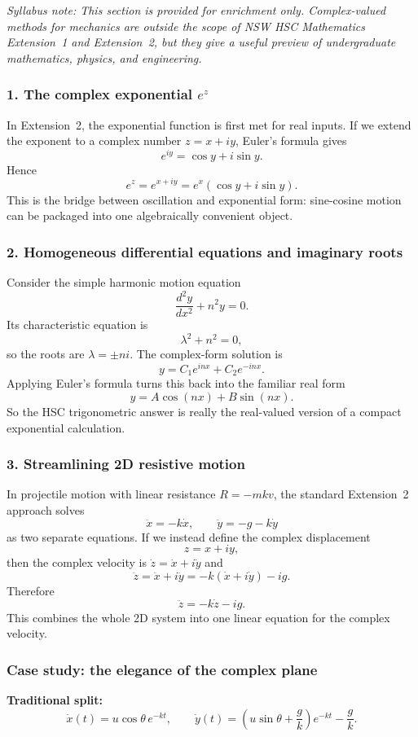 \textit{Syllabus note: This section is provided for enrichment only. Complex-valued methods for mechanics are outside the scope of NSW HSC Mathematics Extension~1 and Extension~2, but they give a useful preview of undergraduate mathematics, physics, and engineering.}

\subsubsection*{1. The complex exponential $e^z$}
In Extension~2, the exponential function is first met for real inputs. If we extend the exponent to a complex number $z=x+iy$, Euler's formula gives
\[
e^{iy}=\cos y+i\sin y.
\]
Hence
\[
e^z=e^{x+iy}=e^x(\cos y+i\sin y).
\]
This is the bridge between oscillation and exponential form: sine-cosine motion can be packaged into one algebraically convenient object.

\subsubsection*{2. Homogeneous differential equations and imaginary roots}
Consider the simple harmonic motion equation
\[
\frac{d^2y}{dx^2}+n^2y=0.
\]
Its characteristic equation is
\[
\lambda^2+n^2=0,
\]
so the roots are $\lambda=\pm ni$. The complex-form solution is
\[
y=C_1e^{inx}+C_2e^{-inx}.
\]
Applying Euler's formula turns this back into the familiar real form
\[
y=A\cos(nx)+B\sin(nx).
\]
So the HSC trigonometric answer is really the real-valued version of a compact exponential calculation.

\subsubsection*{3. Streamlining 2D resistive motion}
In projectile motion with linear resistance $R=-mkv$, the standard Extension~2 approach solves
\[
\ddot{x}=-k\dot{x},
\qquad
\ddot{y}=-g-k\dot{y}
\]
as two separate equations. If we instead define the complex displacement
\[
z=x+iy,
\]
then the complex velocity is $\dot{z}=\dot{x}+i\dot{y}$ and
\[
\ddot{z}=\ddot{x}+i\ddot{y}=-k(\dot{x}+i\dot{y})-ig.
\]
Therefore
\[
\ddot{z}=-k\dot{z}-ig.
\]
This combines the whole 2D system into one linear equation for the complex velocity.

\subsubsection*{Case study: the elegance of the complex plane}
\textbf{Traditional split:}
\[
\dot{x}(t)=u\cos\theta\,e^{-kt},\qquad
\dot{y}(t)=\left(u\sin\theta+\frac{g}{k}\right)e^{-kt}-\frac{g}{k}.
\]

